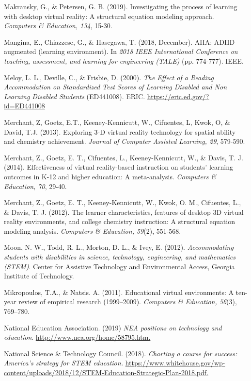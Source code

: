 \documentclass[11.5pt]{sig-alternate} %
\begin{document}
Makransky, G., \& Petersen, G. B. (2019). Investigating the process of learning with desktop virtual reality: A structural equation modeling approach. \textit{Computers \& Education, 134}, 15-30.

Mangina, E., Chiazzese, G., \& Hasegawa, T. (2018, December). AHA: ADHD augmented (learning environment). In \textit{2018 IEEE International Conference on teaching, assessment, and learning for engineering (TALE)} (pp. 774-777). IEEE.
 
Meloy, L. L., Deville, C., \& Frisbie, D. (2000). \textit{The Effect of a Reading Accommodation on Standardized Test Scores of Learning Disabled and Non Learning Disabled Students} (ED441008). ERIC. \url{https://eric.ed.gov/?id=ED441008}

Merchant, Z, Goetz, E.T., Keeney-Kennicutt, W., Cifuentes, L, Kwok, O, \& David, T.J. (2013). Exploring 3-D virtual reality technology for spatial ability and chemistry achievement. \textit{Journal of Computer Assisted Learning, 29}, 579-590.

Merchant, Z., Goetz, E. T., Cifuentes, L., Keeney-Kennicutt, W., \& Davis, T. J. (2014). Effectiveness of virtual reality-based instruction on students' learning outcomes in K-12 and higher education: A meta-analysis. \textit{Computers \& Education, 70}, 29-40.

Merchant, Z., Goetz, E. T., Keeney-Kennicutt, W., Kwok, O. M., Cifuentes, L., \& Davis, T. J. (2012). The learner characteristics, features of desktop 3D virtual reality environments, and college chemistry instruction: A structural equation modeling analysis. \textit{Computers \& Education, 59}(2), 551-568.

Moon, N. W., Todd, R. L., Morton, D. L., \& Ivey, E. (2012). \textit{Accommodating students with disabilities in science, technology, engineering, and mathematics (STEM)}. Center for Assistive Technology and Environmental Access, Georgia Institute of Technology.

Mikropoulos, T.A., \& Natsis. A. (2011). Educational virtual environments: A ten-year review of empirical research (1999–2009). \textit{Computers \& Education, 56}(3), 769–780.

National Education Association. (2019) \textit{NEA positions on technology and education}. \url{http://www.nea.org/home/58795.htm.} 

National Science \& Technology Council. (2018). \textit{Charting a course for success: America’s strategy for STEM education.} \url{https://www.whitehouse.gov/wp-content/uploads/2018/12/STEM-Education-Strategic-Plan-2018.pdf.}
\end{document}
